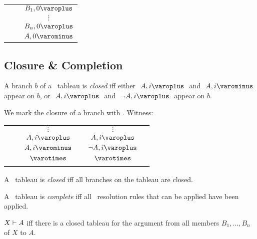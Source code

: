 \begin{tabular}{ c c c }
\\
& & $\dNode{ B_1 }{ 0 } $ \\
& & $\vdots$ \\
& & $\dNode{ B_n }{ 0 }$ \\
& & $\uNode{ A }{ 0 }$\\
\end{tabular}

\subsection{Closure \& Completion}

\begin{definition}\label{closedBranch}
A branch $ b $ of a \GoModal\ tableau is \emph{closed} iff either 
	$ \like{ \dNode{ A }{ i }} $ and $ \like{ \uNode{ A }{ i }} $ appear on $b$, or 
	$ \like{ \dNode{ A }{ i }} $ and $ \like{ \dNode{\neg{A}}{i}}$ appear on $b$. 
\end{definition}

We mark the closure of a branch with \close. Witness:

\begin{tabular}{ c c c c c c }
\\
& & $ \vdots $ & & $ \vdots $ \\
& & $ \dNode{ A }{ i } $ & & $ \dNode{ A }{ i } $ \\
& & $ \uNode{ A }{ i } $ & & $ \dNode{ \neg A }{ i } $ \\
& & $ \close $ & & $ \close $ \\ \\
\end{tabular}

\begin{definition}\label{closedTree}
A \GoModal\ tableau is \emph{closed} iff all branches on the tableau are closed. 
\end{definition}

\begin{definition}\label{completeTree}
A \GoModal\ tableau is \emph{complete} iff all \GoModal\ resolution rules that can be applied have been applied.  
\end{definition}

\begin{definition}\label{provesDef}
$ { X }\vdash{ A } $ iff there is a closed tableau for the argument from all members $ B_1, ..., B_n $ of $ X $ to $ A $.
\end{definition}

